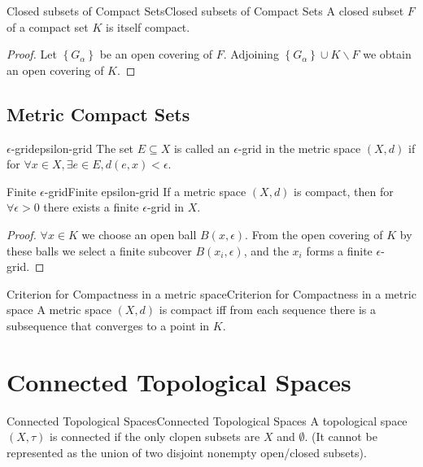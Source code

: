 \documentclass[../main.tex]{subfiles}
\begin{document}
\begin{lemma}{Closed subsets of Compact Sets}{Closed subsets of Compact Sets}
A closed subset $F$ of a compact set $K$ is itself compact.
\end{lemma}
\begin{proof}
Let $\left\{ G_{\alpha} \right\}$ be an open covering of $F$. Adjoining $\left\{ G_{\alpha} \right\}\cup K \backslash F$ we obtain an open covering of $K$.
\end{proof}

\subsection{Metric Compact Sets}

\begin{definition}{$\epsilon$-grid}{epsilon-grid}
The set $E \subseteq X$ is called an $\epsilon$-grid in the metric space $(X,d)$ if for $\forall x\in X, \exists e\in E, d(e,x) < \epsilon$.
\end{definition}

\begin{lemma}{Finite $\epsilon$-grid}{Finite epsilon-grid}
If a metric space $(X,d)$ is compact, then for $\forall \epsilon>0$ there exists a finite $\epsilon$-grid in $X$.
\end{lemma}
\begin{proof}
$\forall x\in K$ we choose an open ball $B(x,\epsilon)$. From the open covering of $K$ by these balls we select a finite subcover $B(x_i,\epsilon)$, and the $x_i$ forms a finite $\epsilon$-grid.
\end{proof}

\begin{theorem}{Criterion for Compactness in a metric space}{Criterion for Compactness in a metric space}
A metric space $(X,d)$ is compact iff from each sequence there is a subsequence that converges to a point in $K$.
\end{theorem}

\section{Connected Topological Spaces}
\begin{definition}{Connected Topological Spaces}{Connected Topological Spaces}
A topological space $(X,\tau)$ is connected if the only clopen subsets are $X$ and $\emptyset $. (It cannot be represented as the union of two disjoint nonempty open/closed subsets).
\end{definition}
\end{document}
